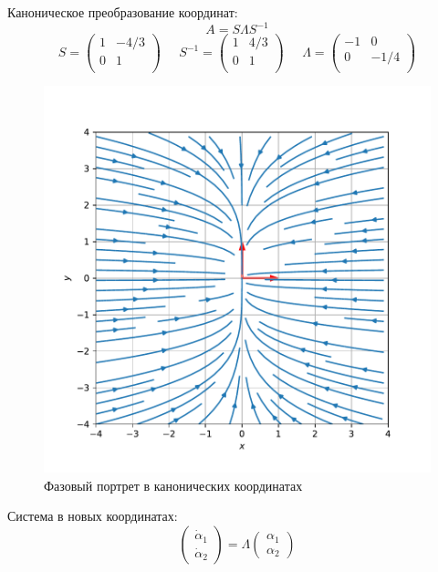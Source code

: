 \documentclass[a4paper, 12pt]{article}
\begin{document}
Каноническое преобразование координат:
\[A = S\Lambda S^{-1}\]
\[
S = \left(
\begin{array}{cc}
1 & -4/3\\
0 & 1\\
\end{array}
\right)\;\;\;\;\;
S^{-1} = \left(
\begin{array}{cc}
1 & 4/3\\
0 & 1\\
\end{array}\right)\;\;\;\;\;
\Lambda = \left(
\begin{array}{cc}
-1 & 0\\
0 & -1/4\\
\end{array}\right)
\]
\begin{figure}[H]
	\centering
	\includegraphics[scale=0.7]{2b1_0}
	\caption{Фазовый портрет в канонических координатах}
	\label{im:1b1_0}
\end{figure}
Система в новых координатах:
\[\left(
\begin{array}{c}
\dot{\alpha}_1\\
\dot{\alpha}_2
\end{array}
\right)=\Lambda\left(
\begin{array}{c}
{\alpha}_1 \\
{\alpha}_2
\end{array}
\right)\]
 
\end{document}

